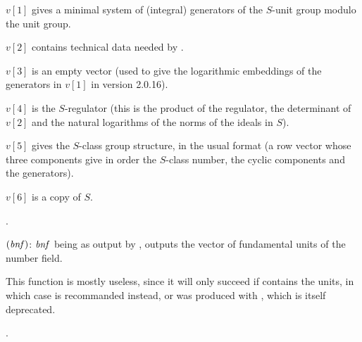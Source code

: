 $v[1]$ gives a minimal system of (integral) generators of the $S$-unit group
modulo the unit group.

$v[2]$ contains technical data needed by .

$v[3]$ is an empty vector (used to give the logarithmic embeddings of the
generators in $v[1]$ in version 2.0.16).

$v[4]$ is the $S$-regulator (this is the product of the regulator, the
determinant of $v[2]$ and the natural logarithms of the norms of the ideals
in $S$).

$v[5]$ gives the $S$-class group structure, in the usual format
(a row vector whose three components give in order the $S$-class number,
the cyclic components and the generators).

$v[6]$ is a copy of $S$.

.

$(\hbox{\it bnf\/})$: $\hbox{\it bnf\/}$ being as output by
, outputs the vector of fundamental units of the number field.

This function is mostly useless, since it will only succeed if
 contains the units, in which case  is recommanded
instead, or  was produced with , which is itself
deprecated.

.

